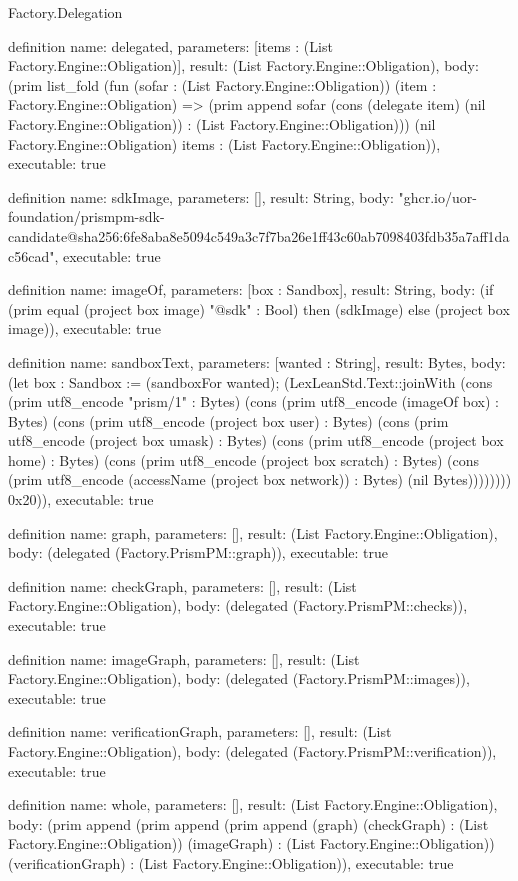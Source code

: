 \begin{lexlean}{Factory.Delegation}
\begin{semanticmodule}
definition{
  name: delegated,
  parameters: [items : (List Factory.Engine::Obligation)],
  result: (List Factory.Engine::Obligation),
  body: (prim list_fold (fun (sofar : (List Factory.Engine::Obligation)) (item : Factory.Engine::Obligation) => (prim append sofar (cons (delegate item) (nil Factory.Engine::Obligation)) : (List Factory.Engine::Obligation))) (nil Factory.Engine::Obligation) items : (List Factory.Engine::Obligation)),
  executable: true
}

definition{
  name: sdkImage,
  parameters: [],
  result: String,
  body: "ghcr.io/uor-foundation/prismpm-sdk-candidate@sha256:6fe8aba8e5094c549a3c7f7ba26e1ff43c60ab7098403fdb35a7aff1dac56cad",
  executable: true
}

definition{
  name: imageOf,
  parameters: [box : Sandbox],
  result: String,
  body: (if (prim equal (project box image) "@sdk" : Bool) then (sdkImage) else (project box image)),
  executable: true
}

definition{
  name: sandboxText,
  parameters: [wanted : String],
  result: Bytes,
  body: (let box : Sandbox := (sandboxFor wanted); (LexLeanStd.Text::joinWith (cons (prim utf8_encode "prism/1" : Bytes) (cons (prim utf8_encode (imageOf box) : Bytes) (cons (prim utf8_encode (project box user) : Bytes) (cons (prim utf8_encode (project box umask) : Bytes) (cons (prim utf8_encode (project box home) : Bytes) (cons (prim utf8_encode (project box scratch) : Bytes) (cons (prim utf8_encode (accessName (project box network)) : Bytes) (nil Bytes)))))))) 0x20)),
  executable: true
}

definition{
  name: graph,
  parameters: [],
  result: (List Factory.Engine::Obligation),
  body: (delegated (Factory.PrismPM::graph)),
  executable: true
}

definition{
  name: checkGraph,
  parameters: [],
  result: (List Factory.Engine::Obligation),
  body: (delegated (Factory.PrismPM::checks)),
  executable: true
}

definition{
  name: imageGraph,
  parameters: [],
  result: (List Factory.Engine::Obligation),
  body: (delegated (Factory.PrismPM::images)),
  executable: true
}

definition{
  name: verificationGraph,
  parameters: [],
  result: (List Factory.Engine::Obligation),
  body: (delegated (Factory.PrismPM::verification)),
  executable: true
}

definition{
  name: whole,
  parameters: [],
  result: (List Factory.Engine::Obligation),
  body: (prim append (prim append (prim append (graph) (checkGraph) : (List Factory.Engine::Obligation)) (imageGraph) : (List Factory.Engine::Obligation)) (verificationGraph) : (List Factory.Engine::Obligation)),
  executable: true
}


\end{semanticmodule}
\end{lexlean}

